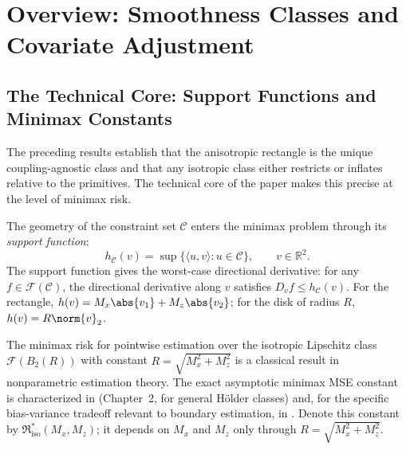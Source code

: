 \section{Overview: Smoothness Classes and Covariate Adjustment}\label{sec:overview}



\subsection{The Technical Core: Support Functions and Minimax Constants}\label{sec:overview:technical_core}

The preceding results establish that the anisotropic rectangle is the unique coupling-agnostic class and that any isotropic class either restricts or inflates relative to the primitives.
The technical core of the paper makes this precise at the level of minimax risk.

The geometry of the constraint set $\mathcal{C}$ enters the minimax problem through its \emph{support function}:
\begin{equation*}
	h_{\mathcal{C}}(v) = \sup\bigl\{ \langle u, v \rangle : u \in \mathcal{C} \bigr\}, \qquad v \in \mathbb{R}^2.
\end{equation*}
The support function gives the worst-case directional derivative: for any $f \in \mathcal{F}(\mathcal{C})$, the directional derivative along $v$ satisfies $D_v f \leq h_{\mathcal{C}}(v)$.
For the rectangle, $h(v) = M_x \abs{v_1} + M_z \abs{v_2}$; for the disk of radius $R$, $h(v) = R \norm{v}_2$.

The minimax risk for pointwise estimation over the isotropic Lipschitz class $\mathcal{F}(B_2(R))$ with constant $R = \sqrt{M_x^2 + M_z^2}$ is a classical result in nonparametric estimation theory.
The exact asymptotic minimax MSE constant is characterized in \textcite{tsybakov_introduction_2009} (Chapter~2, for general Hölder classes) and, for the specific bias-variance tradeoff relevant to boundary estimation, in \textcite{donoho_statistical_1994}.
Denote this constant by $\mathfrak{R}^*_{\mathrm{iso}}(M_x, M_z)$; it depends on $M_x$ and $M_z$ only through $R = \sqrt{M_x^2 + M_z^2}$.

